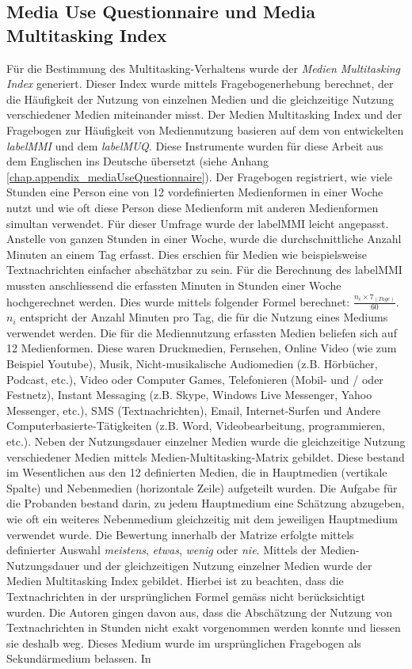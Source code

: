 \subsection{Media Use Questionnaire und Media Multitasking Index}\label{subsection.muq}
Für die Bestimmung des Multitasking-Verhaltens wurde der \textit{Medien Multitasking Index} generiert. Dieser Index wurde mittels Fragebogenerhebung berechnet, der die Häufigkeit der Nutzung von einzelnen Medien und die gleichzeitige Nutzung verschiedener Medien miteinander misst. Der Medien Multitasking Index und der Fragebogen zur Häufigkeit von Mediennutzung basieren auf dem von  entwickelten \textit{\gls{labelMMI}} und dem \textit{\gls{labelMUQ}}. Diese Instrumente wurden für diese Arbeit aus dem Englischen ins Deutsche übersetzt (siehe Anhang \ref{chap.appendix_mediaUseQuestionnaire}). Der Fragebogen registriert, wie viele Stunden eine Person eine von 12 vordefinierten Medienformen in einer Woche nutzt und wie oft diese Person diese Medienform mit anderen Medienformen simultan verwendet. Für dieser Umfrage wurde der \gls{labelMMI} leicht angepasst. Anstelle von ganzen Stunden in einer Woche, wurde die durchschnittliche Anzahl Minuten an einem Tag erfasst. Dies erschien für Medien wie beispielsweise Textnachrichten einfacher abschätzbar zu sein. Für die Berechnung des \gls{labelMMI} mussten anschliessend die erfassten Minuten in Stunden einer Woche hochgerechnet werden. Dies wurde mittels folgender Formel berechnet: \(\frac{n_{i} \times 7_{(Tage)}}{60}\). \(n_{i}\) entspricht der Anzahl Minuten pro Tag, die für die Nutzung eines Mediums verwendet werden. Die für die Mediennutzung erfassten Medien beliefen sich auf 12 Medienformen. Diese waren Druckmedien, Fernsehen, Online Video (wie zum Beispiel Youtube), Musik, Nicht-musikalische Audiomedien (z.B. Hörbücher, Podcast, etc.), Video oder Computer Games, Telefonieren (Mobil- und / oder Festnetz), Instant Messaging (z.B. Skype, Windows Live Messenger, Yahoo Messenger, etc.), SMS (Textnachrichten), Email, Internet-Surfen und Andere Computerbasierte-Tätigkeiten (z.B. Word, Videobearbeitung, programmieren, etc.). Neben der Nutzungsdauer einzelner Medien wurde die gleichzeitige Nutzung verschiedener Medien mittels Medien-Multitasking-Matrix gebildet. Diese bestand im Wesentlichen aus den 12 definierten Medien, die in Hauptmedien (vertikale Spalte) und Nebenmedien (horizontale Zeile) aufgeteilt wurden. Die Aufgabe für die Probanden bestand darin, zu jedem Hauptmedium eine Schätzung abzugeben, wie oft ein weiteres Nebenmedium gleichzeitig mit dem jeweiligen Hauptmedium verwendet wurde. Die Bewertung innerhalb der Matrize erfolgte mittels definierter Auswahl \textit{meistens}, \textit{etwas}, \textit{wenig} oder \textit{nie}. Mittels der Medien-Nutzungsdauer und der gleichzeitigen Nutzung einzelner Medien wurde der Medien Multitasking Index gebildet. Hierbei ist zu beachten, dass die Textnachrichten in der ursprünglichen Formel gemäss \cite{Ophir2009}  nicht berücksichtigt wurden. Die Autoren gingen davon aus, dass die Abschätzung der Nutzung von Textnachrichten in Stunden nicht exakt vorgenommen werden konnte und liessen sie deshalb weg. Dieses Medium wurde im ursprünglichen Fragebogen als Sekundärmedium belassen. In 